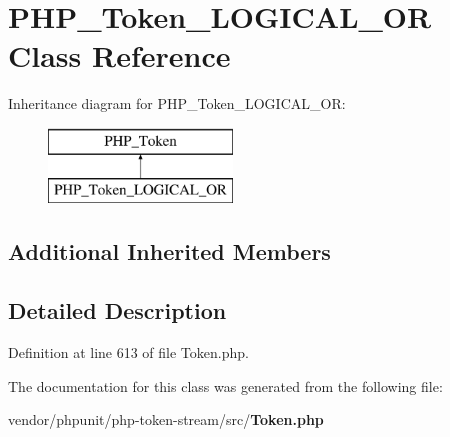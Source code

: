 \section{P\+H\+P\+\_\+\+Token\+\_\+\+L\+O\+G\+I\+C\+A\+L\+\_\+\+O\+R Class Reference}
\label{class_p_h_p___token___l_o_g_i_c_a_l___o_r}
Inheritance diagram for P\+H\+P\+\_\+\+Token\+\_\+\+L\+O\+G\+I\+C\+A\+L\+\_\+\+O\+R\+:\begin{figure}[H]
\begin{center}
\leavevmode
\includegraphics[height=2.000000cm]{class_p_h_p___token___l_o_g_i_c_a_l___o_r}
\end{center}
\end{figure}
\subsection*{Additional Inherited Members}


\subsection{Detailed Description}


Definition at line 613 of file Token.\+php.



The documentation for this class was generated from the following file\+:\begin{DoxyCompactItemize}
\item 
vendor/phpunit/php-\/token-\/stream/src/{\bf Token.\+php}\end{DoxyCompactItemize}
